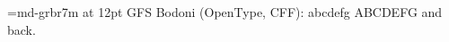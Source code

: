 \documentclass{article}
\begin{document}
\font\bodoni=md-grbr7m at 12pt
GFS Bodoni (OpenType, CFF): {\bodoni abcdefg ABCDEFG} and back.
\end{document}
